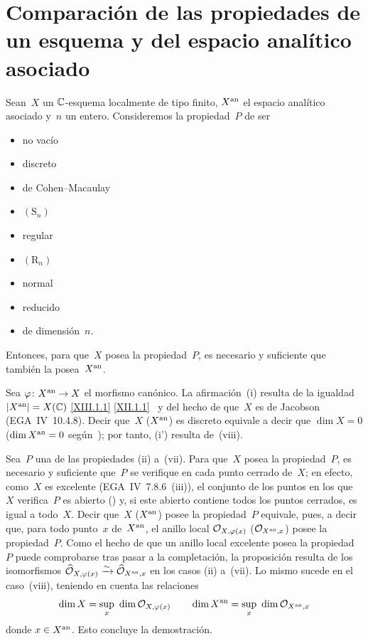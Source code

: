 
\section[Comparación de las propiedades de un esquema]{Comparación de las propiedades de un esquema y del espacio
analítico \hbox{asociado}}
\label{XII.2}

\begin{proposition}
\label{XII.2.1}
Sean~$X$ un $\CC$-esquema localmente de tipo finito, $X^{\an}$ el espacio
analítico asociado y~$n$ un entero. Consideremos la propiedad~$P$ de ser
\begin{itemize}
\item[(i)] no vacío
\item[(i')] discreto
\item[(ii)] de Cohen--Macaulay
\item[(iii)] $(\mathrm{S}_n)$
\item[(iv)] regular
\item[(v)] $(\mathrm{R}_n)$
\item[(vi)] normal
\item[(vii)] reducido
\item[(viii)] de dimensión~$n$.
\end{itemize}
Entonces, para que~$X$ posea la propiedad~$P$, es necesario y suficiente que
también la posea~$X^{\an}$.
\end{proposition}

Sea $\varphi\colon X^{\an}\to X$ el morfismo canónico. La afirmación~(i)
resulta de la igualdad $|X^{\an}|=X(\CC)$
{\eqref{XIII.1.1}}
{\eqref{XII.1.1}}%
~y del hecho de que~$X$ es de Jacobson (EGA~IV~10.4.8). Decir que~$X$
(\resp $X^{\an}$) es discreto equivale a decir que $\dim X=0$
(\resp $\dim X^{\an}=0$ según~\cite[~\S 4~cor]{XII.4}); por
tanto, (i') resulta de~(viii).

Sea~$P$ una de las propiedades (ii) a~(vii). Para que~$X$ posea la
propiedad~$P$, es necesario y suficiente que~$P$ se verifique en cada punto
cerrado de~$X$; en efecto, como~$X$ es excelente (EGA~IV~7.8.6~(iii)), el
conjunto de los puntos
en los que~$X$ verifica~$P$ es abierto (\loccit) y, si este abierto contiene
todos los puntos cerrados, es igual a todo~$X$. Decir que~$X$
(\resp $X^{\an}$) posee la propiedad~$P$ equivale, pues, a decir que, para
todo punto~$x$ de~$X^{\an}$, el anillo local
$\cal{O}_{X,\varphi(x)}$ (\resp $\cal{O}_{X^{\an},x}$) posee la propiedad~$P$.
Como el hecho de que un anillo local excelente posea la propiedad~$P$ puede
comprobarse tras pasar a la completación, la proposición resulta de los
isomorfismos
$\widehat{\cal{O}}_{X,\varphi(x)}\isomto\widehat{\cal{O}}_{X^{\an},x}$ en
los casos (ii) a~(vii). Lo mismo sucede en el caso~(viii), teniendo en cuenta
las relaciones
$$
\dim X=\sup_x~\dim \cal{O}_{X,\varphi(x)}\qquad \dim
X^{\an}=\sup_x~\dim \cal{O}_{X^{\an},x}
$$
donde $x\in X^{\an}$. Esto concluye la demostración.

